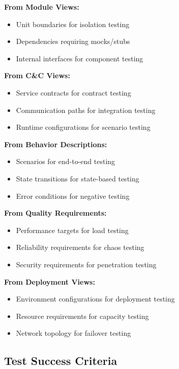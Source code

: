 \documentclass[11pt]{article}
\begin{document}
\begin{testbox}

\textbf{From Module Views:}
\begin{itemize}[nosep]
    \item Unit boundaries for isolation testing
    \item Dependencies requiring mocks/stubs
    \item Internal interfaces for component testing
\end{itemize}

\textbf{From C\&C Views:}
\begin{itemize}[nosep]
    \item Service contracts for contract testing
    \item Communication paths for integration testing
    \item Runtime configurations for scenario testing
\end{itemize}

\textbf{From Behavior Descriptions:}
\begin{itemize}[nosep]
    \item Scenarios for end-to-end testing
    \item State transitions for state-based testing
    \item Error conditions for negative testing
\end{itemize}

\textbf{From Quality Requirements:}
\begin{itemize}[nosep]
    \item Performance targets for load testing
    \item Reliability requirements for chaos testing
    \item Security requirements for penetration testing
\end{itemize}

\textbf{From Deployment Views:}
\begin{itemize}[nosep]
    \item Environment configurations for deployment testing
    \item Resource requirements for capacity testing
    \item Network topology for failover testing
\end{itemize}
\end{testbox}

\subsection{Test Success Criteria}
\end{document}
